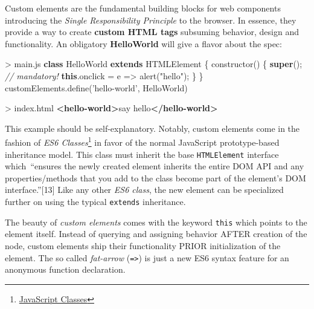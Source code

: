 \documentclass[]{article}
\newenvironment{Shaded}{}{}
\newcommand{\KeywordTok}[1]{\textcolor[rgb]{0.00,0.44,0.13}{\textbf{{#1}}}}
\newcommand{\StringTok}[1]{\textcolor[rgb]{0.25,0.44,0.63}{{#1}}}
\newcommand{\CommentTok}[1]{\textcolor[rgb]{0.38,0.63,0.69}{\textit{{#1}}}}
\newcommand{\VariableTok}[1]{\textcolor[rgb]{0.10,0.09,0.49}{{#1}}}
\newcommand{\OperatorTok}[1]{\textcolor[rgb]{0.40,0.40,0.40}{{#1}}}
\newcommand{\AttributeTok}[1]{\textcolor[rgb]{0.49,0.56,0.16}{{#1}}}
\newcommand{\NormalTok}[1]{{#1}}
\begin{document}
Custom elements are the fundamental building blocks for web components
introducing the \emph{Single Responsibility Principle} to the browser.
In essence, they provide a way to create \textbf{custom HTML tags}
subsuming behavior, design and functionality. An obligatory
\textbf{HelloWorld} will give a flavor about the spec:

\begin{Shaded}
\begin{Highlighting}[]
\OperatorTok{>} \VariableTok{main}\NormalTok{.}\AttributeTok{js}
\KeywordTok{class} \NormalTok{HelloWorld }\KeywordTok{extends} \NormalTok{HTMLElement }\OperatorTok{\{}
 \AttributeTok{constructor}\NormalTok{() }\OperatorTok{\{}
  \KeywordTok{super}\NormalTok{()}\OperatorTok{;} \CommentTok{// mandatory!}
  \KeywordTok{this}\NormalTok{.}\AttributeTok{onclick} \OperatorTok{=} \NormalTok{e }\OperatorTok{=>} \AttributeTok{alert}\NormalTok{(}\StringTok{"hello"}\NormalTok{)}\OperatorTok{;}
 \OperatorTok{\}}
\OperatorTok{\}}
\VariableTok{customElements}\NormalTok{.}\AttributeTok{define}\NormalTok{(}\StringTok{'hello-world'}\OperatorTok{,} \NormalTok{HelloWorld)}
\end{Highlighting}
\end{Shaded}

\begin{Shaded}
\begin{Highlighting}[]
\NormalTok{> index.html}
\KeywordTok{<hello-world>}\NormalTok{say hello}\KeywordTok{</hello-world>}
\end{Highlighting}
\end{Shaded}

This example should be self-explanatory. Notably, custom elements come
in the fashion of \emph{ES6 Classes}\footnote{\href{https://developer.mozilla.org/en/docs/Web/JavaScript/Reference/Classes}{JavaScript
  Classes}} in favor of the normal JavaScript prototype-based
inheritance model. This class must inherit the base \texttt{HTMLElement}
interface which~``ensures the newly created element inherits the entire
DOM API and any properties/methods that you add to the class become part
of the element's DOM interface.''{[}13{]} Like any other \emph{ES6
class}, the new element can be specialized further on using the typical
\texttt{extends} inheritance.

The beauty of \emph{custom elements} comes with the keyword
\texttt{this} which points to the element itself. Instead of querying
and assigning behavior AFTER creation of the node, custom elements ship
their functionality PRIOR initialization of the element. The so called
\emph{fat-arrow} (\texttt{=\textgreater{}}) is just a new ES6 syntax
feature for an anonymous function declaration.
\end{document}
